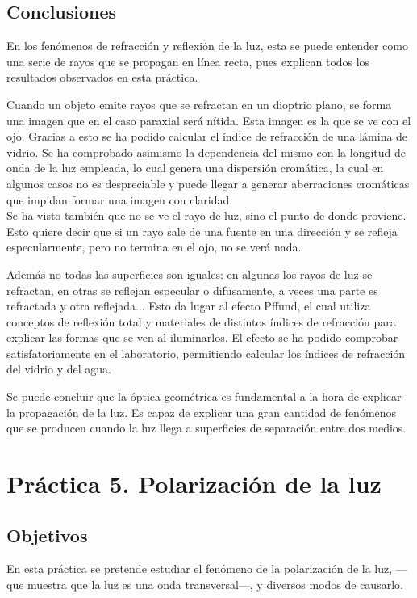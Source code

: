 \documentclass[12pt]{article}
\numberwithin{table}{section}
\numberwithin{figure}{section}
\numberwithin{equation}{section}
\begin{document}
\subsection{Conclusiones}
En los fenómenos de refracción y reflexión de la luz, esta se puede entender como una serie de rayos que se propagan en línea recta, pues explican todos los resultados observados en esta práctica.

Cuando un objeto emite rayos que se refractan en un dioptrio plano, se forma una imagen que en el caso paraxial será nítida. Esta imagen es la que se ve con el ojo. Gracias a esto se ha podido calcular el índice de refracción de una lámina de vidrio. Se ha comprobado asimismo la dependencia del mismo con la longitud de onda de la luz empleada, lo cual genera una dispersión cromática, la cual en algunos casos no es despreciable y puede llegar a generar aberraciones cromáticas que impidan formar una imagen con claridad.
\\

Se ha visto también que no se ve el rayo de luz, sino el punto de donde proviene. Esto quiere decir que si un rayo sale de una fuente en una dirección y se refleja especularmente, pero no termina en el ojo, no se verá nada.

Además no todas las superficies son iguales: en algunas los rayos de luz se refractan, en otras se reflejan especular o difusamente, a veces una parte es refractada y otra reflejada... Esto da lugar al efecto Pffund, el cual utiliza conceptos de reflexión total y materiales de distintos índices de refracción para explicar las formas que se ven al iluminarlos. El efecto se ha podido comprobar satisfatoriamente en el laboratorio, permitiendo calcular los índices de refracción del vidrio y del agua.

Se puede concluir que la óptica geométrica es fundamental a la hora de explicar la propagación de la luz. Es capaz de explicar una gran cantidad de fenómenos que se producen cuando la luz llega a superficies de separación entre dos medios.

\section{Práctica 5. Polarización de la luz}
\subsection{Objetivos}
En esta práctica se pretende estudiar el fenómeno de la polarización de la luz, ---que muestra que la luz es una onda transversal---, y diversos modos de causarlo.
\end{document}
